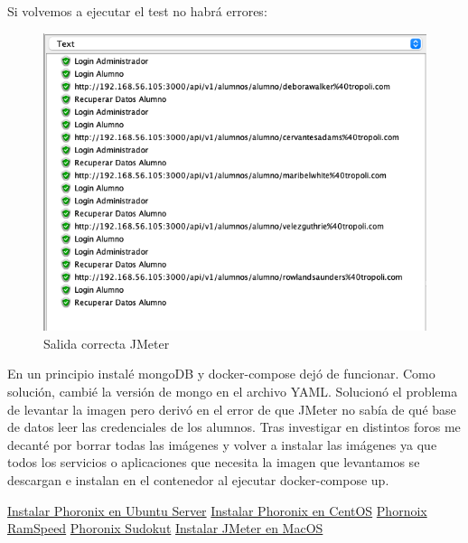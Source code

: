 Si volvemos a ejecutar el test no habrá errores:
\begin{figure}[H]
    \centering  
    \includegraphics[scale=0.5]{images/jmeter_correcto.png}
    \caption{Salida correcta JMeter}
    \label{fig:jmeter_correcto2}
\end{figure}

En un principio instalé mongoDB y docker-compose dejó de funcionar. Como solución, cambié la versión de mongo en el archivo YAML. Solucionó el problema de levantar la imagen pero
derivó en el error de que JMeter no sabía de qué base de datos leer las credenciales de los alumnos. Tras investigar en distintos foros me decanté por borrar todas las imágenes y
volver a instalar las imágenes ya que todos los servicios o aplicaciones que necesita la imagen que levantamos se descargan e instalan en el contenedor al ejecutar docker-compose up.


\newpage

\begin{thebibliography}{0}
    \bibitem{} \href{https://ubunlog.com/phoronix-test-suite-una-herramienta-para-benchmark-multiplataforma/}{Instalar Phoronix en Ubuntu Server}
    \bibitem{} \href{https://arstech.net/phoronix-test-suite/}{Instalar Phoronix en CentOS}
    \bibitem{} \href{https://openbenchmarking.org/test/pts/ramspeed}{Phornoix RamSpeed}
    \bibitem{} \href{https://openbenchmarking.org/test/pts/sudokut}{Phoronix Sudokut}
    \bibitem{} \href{https://formulae.brew.sh/formula/jmeter}{Instalar JMeter en MacOS}
\end{thebibliography}


